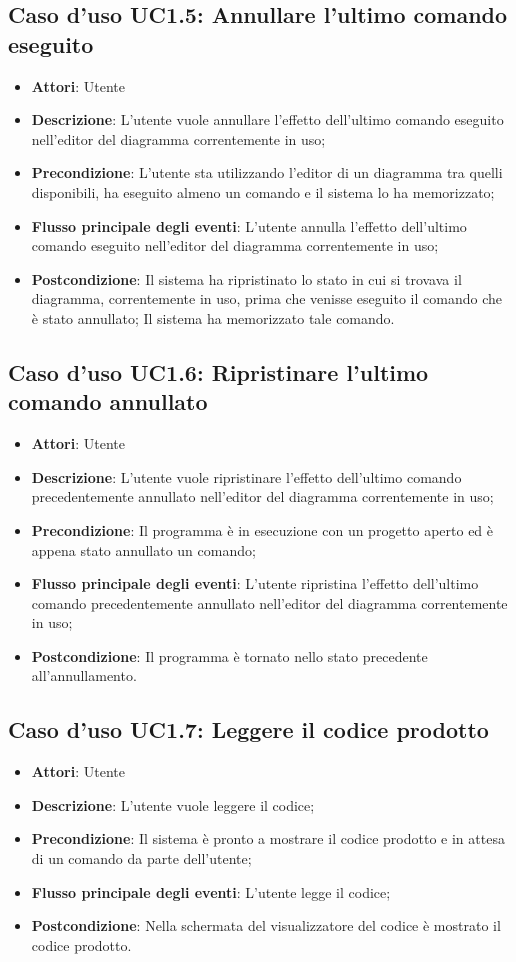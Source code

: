 \documentclass[../AnalisiDeiRequisiti.tex]{subfiles}
\begin{document}
	\subsection{Caso d'uso UC1.5: Annullare l'ultimo comando eseguito}
	\begin{itemize}
		\item \textbf{Attori}: Utente
		\item \textbf{Descrizione}: L'utente vuole annullare l'effetto dell'ultimo comando eseguito nell'editor del diagramma correntemente in uso;
		\item \textbf{Precondizione}: L'utente sta utilizzando l'editor di un diagramma tra quelli disponibili, ha eseguito almeno un comando e il sistema lo ha memorizzato;
		\item \textbf{Flusso principale degli eventi}: L'utente annulla l'effetto dell'ultimo comando eseguito nell'editor del diagramma correntemente in uso;
		\item \textbf{Postcondizione}: Il sistema ha ripristinato lo stato in cui si trovava il diagramma, correntemente in uso, prima che venisse eseguito il comando che è stato annullato; Il sistema ha memorizzato tale comando.
	\end{itemize}
	\subsection{Caso d'uso UC1.6: Ripristinare l'ultimo comando annullato}
	\begin{itemize}
		\item \textbf{Attori}: Utente
		\item \textbf{Descrizione}: L'utente vuole ripristinare l'effetto dell'ultimo comando precedentemente annullato nell'editor del diagramma correntemente in uso;
		\item \textbf{Precondizione}: Il programma è in esecuzione con un progetto aperto ed è appena stato annullato un comando;
		\item \textbf{Flusso principale degli eventi}: L'utente ripristina l'effetto dell'ultimo comando precedentemente annullato nell'editor del diagramma correntemente in uso;
		\item \textbf{Postcondizione}: Il programma è tornato nello stato precedente all'annullamento.
	\end{itemize}
	\subsection{Caso d'uso UC1.7: Leggere il codice prodotto}
	\begin{itemize}
		\item \textbf{Attori}: Utente
		\item \textbf{Descrizione}: L'utente vuole leggere il codice;
		\item \textbf{Precondizione}: Il sistema è pronto a mostrare il codice prodotto e in attesa di un comando da parte dell'utente;
		\item \textbf{Flusso principale degli eventi}: L'utente legge il codice;
		\item \textbf{Postcondizione}: Nella schermata del visualizzatore del codice è mostrato il codice prodotto.
	\end{itemize}
\end{document}
